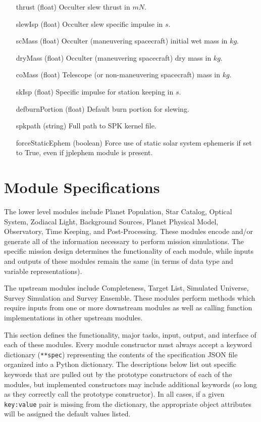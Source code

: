 \documentclass[cleanfoot]{asme2ej}
\begin{document}
\begin{itemize}[leftmargin=1in,font={\ttfamily}]
\item[thrust] (float) Occulter slew thrust in $ mN $.
\item[slewIsp] (float) Occulter slew specific impulse in $ s $. 
\item[scMass] (float) Occulter (maneuvering spacecraft) initial wet mass in $ kg $. 
\item[dryMass] (float) Occulter (maneuvering spacecraft) dry mass in $ kg $. 
\item[coMass] (float) Telescope (or non-maneuvering spacecraft) mass in $ kg $. 
\item[skIsp] (float) Specific impulse for station keeping in $ s $. 
\item[defburnPortion] (float) Default burn portion for slewing. 
\item[spkpath] (string) Full path to SPK kernel file.
\item[forceStaticEphem]  (boolean) Force use of static solar system ephemeris if set to True, even if jplephem module is present.
\end{itemize}


\section{Module Specifications}\label{sec:modules}
The lower level modules include Planet Population, Star Catalog, Optical System, Zodiacal Light, Background Sources, Planet Physical Model, Observatory, Time Keeping, and Post-Processing.  These modules encode and/or generate all of the information necessary to perform mission simulations.  The specific mission design determines the functionality of each module, while inputs and outputs of these modules remain the same (in terms of data type and variable representations).  

The upstream modules include Completeness, Target List, Simulated Universe, Survey Simulation and Survey Ensemble. These modules perform methods which require inputs from one or more downstream modules as well as calling function implementations in other upstream modules. 

This section defines the functionality, major tasks, input, output, and interface of each of these modules. Every module constructor must always accept a keyword dictionary (\verb+**spec+) representing the contents of the specification JSON file organized into a Python dictionary. The descriptions below list out specific keywords that are pulled out by the prototype constructors of each of the modules, but implemented constructors may include additional keywords (so long as they correctly call the prototype constructor).  In all cases, if a given \verb+key:value+ pair is missing from the dictionary, the appropriate object attributes will be assigned the default values listed.
\end{document}
